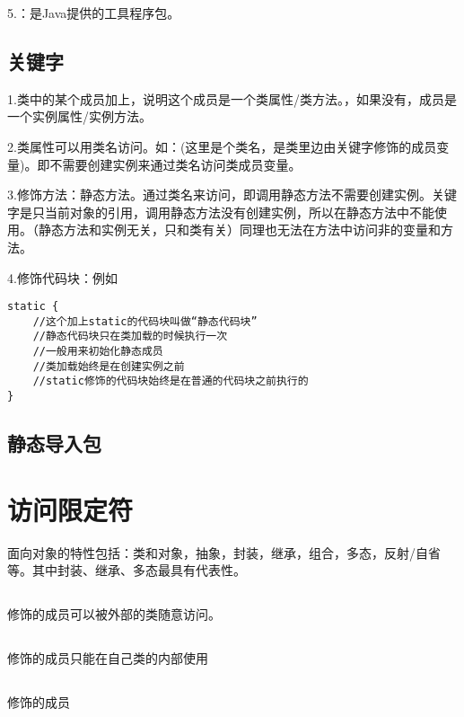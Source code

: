 \documentclass[a4paper]{report}
\begin{document}
5.：是Java提供的工具程序包。
\subsection{关键字}
1.类中的某个成员加上，说明这个成员是一个类属性/类方法。，如果没有，成员是一个实例属性/实例方法。

2.类属性可以用类名访问。如：(这里是个类名，是类里边由关键字修饰的成员变量)。即不需要创建实例来通过类名访问类成员变量。

3.修饰方法：静态方法。通过类名来访问，即调用静态方法不需要创建实例。关键字是只当前对象的引用，调用静态方法没有创建实例，所以在静态方法中不能使用。（静态方法和实例无关，只和类有关）同理也无法在方法中访问非的变量和方法。

4.修饰代码块：例如
\begin{lstlisting}[title=\dm{static}修饰代码块]
static {
    //这个加上static的代码块叫做“静态代码块”
    //静态代码块只在类加载的时候执行一次
    //一般用来初始化静态成员
    //类加载始终是在创建实例之前
    //static修饰的代码块始终是在普通的代码块之前执行的
}
\end{lstlisting}

\subsection{静态导入包}

\section{访问限定符}
面向对象的特性包括：类和对象，抽象，封装，继承，组合，多态，反射/自省等。其中封装、继承、多态最具有代表性。
\subsection{}
修饰的成员可以被外部的类随意访问。

\subsection{}
修饰的成员只能在自己类的内部使用

\subsection{}
修饰的成员
\end{document}
